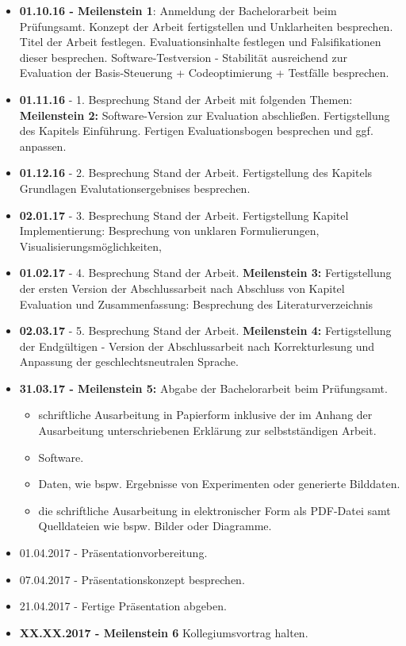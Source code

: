 \begin{itemize}
\item \textbf{01.10.16 - Meilenstein 1}: Anmeldung der Bachelorarbeit beim Prüfungsamt. 
Konzept der Arbeit fertigstellen und Unklarheiten besprechen. Titel der Arbeit festlegen.
Evaluationsinhalte festlegen und Falsifikationen dieser besprechen.
Software-Testversion - Stabilität ausreichend zur Evaluation der Basis-Steuerung + Codeoptimierung + Testfälle besprechen. 


\item  \textbf{01.11.16} - 1. Besprechung Stand der Arbeit mit folgenden Themen:
 \textbf{Meilenstein 2:} Software-Version zur Evaluation abschließen.
Fertigstellung des Kapitels Einführung. 
Fertigen Evaluationsbogen besprechen und ggf. anpassen.


\item  \textbf{01.12.16} - 2. Besprechung Stand der Arbeit.
Fertigstellung des Kapitels Grundlagen
Evalutationsergebnises besprechen.

\item  \textbf{02.01.17} - 3. Besprechung Stand der Arbeit.
Fertigstellung Kapitel Implementierung: Besprechung von unklaren Formulierungen, Visualisierungsmöglichkeiten,

\item  \textbf{01.02.17} - 4. Besprechung Stand der Arbeit.
 \textbf{Meilenstein 3:} Fertigstellung der ersten Version der Abschlussarbeit nach Abschluss von Kapitel Evaluation und Zusammenfassung: Besprechung des Literaturverzeichnis

\item  \textbf{02.03.17} - 5. Besprechung Stand der Arbeit.
 \textbf{Meilenstein 4:} Fertigstellung der Endgültigen - Version der Abschlussarbeit nach Korrekturlesung und Anpassung der geschlechtsneutralen Sprache.

\item \textbf{31.03.17 - Meilenstein 5:} Abgabe der Bachelorarbeit beim Prüfungsamt. \begin{itemize}
\item schriftliche Ausarbeitung in Papierform inklusive der im Anhang der Ausarbeitung unterschriebenen Erklärung zur selbstständigen Arbeit.
\item Software.
\item Daten, wie bspw. Ergebnisse von Experimenten oder generierte Bilddaten.
\item die schriftliche Ausarbeitung in elektronischer Form als PDF-Datei samt Quelldateien wie bspw. Bilder oder Diagramme. 
\end{itemize}
\item 01.04.2017 - Präsentationvorbereitung.
\item 07.04.2017 - Präsentationskonzept besprechen. 
\item 21.04.2017 - Fertige Präsentation abgeben.
\item \textbf{XX.XX.2017 - Meilenstein 6} Kollegiumsvortrag halten. 

\end{itemize}



